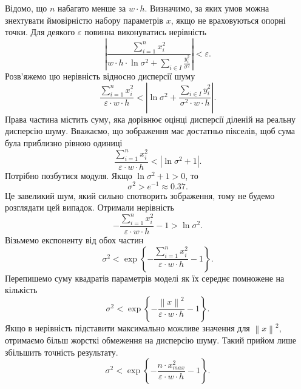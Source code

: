 Відомо, що $n$ набагато менше за $w \cdot h$.
Визначимо, за яких умов можна знехтувати ймовірністю набору параметрів $x$,
якщо не враховуються опорні точки.
Для деякого $\varepsilon$ повинна виконуватись нерівність
\begin{equation*}
  \left|
    \frac{\sum\limits_{i = 1}^n x_i^2}
         {w \cdot h \cdot \ln{\sigma^2}
          + \sum\limits_{i \in I}
            \frac{y_i^2}{\sigma^2}}
  \right|
  < \varepsilon.
\end{equation*}
Розв'яжемо цю нерівність відносно дисперсії шуму
\begin{equation*}
  \frac{\sum\limits_{i = 1}^n x_i^2}{\varepsilon \cdot w \cdot h}
  < \left| \ln\sigma^2
    + \frac{\sum\limits_{i \in I} y_i^2}
           {\sigma^2 \cdot w \cdot h}
   \right|.
\end{equation*}
Права частина містить суму, яка дорівнює оцінці дисперсії
діленій на реальну дисперсію шуму.
Вважаємо, що зображення має достатньо пікселів,
щоб сума була приблизно рівною одиниці
\begin{equation*}
  \frac{\sum\limits_{i = 1}^n x_i^2}{\varepsilon \cdot w \cdot h}
  < \left| \ln\sigma^2 + 1 \right|.
\end{equation*}
Потрібно позбутися модуля.
Якщо $\ln\sigma^2 + 1 > 0$, то
\begin{equation*}
  \sigma^2 > e^{-1} \approx 0.37.
\end{equation*}
Це завеликий шум, який сильно спотворить зображення,
тому не будемо розглядати цей випадок.
Отримали нерівність
\begin{equation*}
  - \frac{\sum\limits_{i = 1}^n x_i^2}{\varepsilon \cdot w \cdot h} - 1
  > \ln\sigma^2.
\end{equation*}
Візьмемо експоненту від обох частин
\begin{equation*}
  \sigma^2
  < \exp{\left\{
      - \frac{\sum\limits_{i = 1}^n x_i^2}
             {\varepsilon \cdot w \cdot h}
      - 1
    \right\}}.
\end{equation*}
Перепишемо суму квадратів параметрів моделі як їх середнє помножене на кількість
\begin{equation*}
  \sigma^2
  < \exp{\left\{
      - \frac{\left\| x \right\|^2}
             {\varepsilon \cdot w \cdot h}
      - 1
    \right\}}.
\end{equation*}
Якщо в нерівність підставити максимально можливе значення для
$\left\| x \right\|^2$,
отримаємо більш жорсткі обмеження на дисперсію шуму.
Такий прийом лише збільшить точність результату.
\begin{equation*}
  \sigma^2
  < \exp{\left\{
      - \frac{n \cdot x_{max}^2}
             {\varepsilon \cdot w \cdot h}
      - 1
    \right\}}.
\end{equation*}
